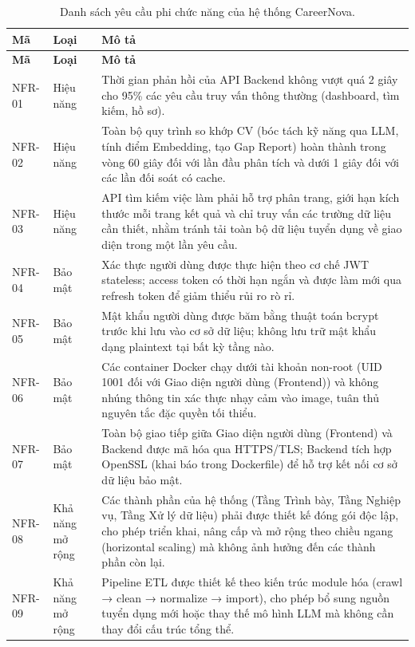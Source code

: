 \begin{longtable}{|L{1.5cm}|L{2.8cm}|L{9.2cm}|}
\caption{Danh sách yêu cầu phi chức năng của hệ thống CareerNova.}
\label{tab:nonfunctional_requirements} \\
\hline
\textbf{Mã} & \textbf{Loại} & \textbf{Mô tả} \\
\hline
\endfirsthead
\hline
\textbf{Mã} & \textbf{Loại} & \textbf{Mô tả} \\
\hline
\endhead
NFR-01 & Hiệu năng & Thời gian phản hồi của API Backend không vượt quá 2 giây cho 95\% các yêu cầu truy vấn thông thường (dashboard, tìm kiếm, hồ sơ). \\
\hline
NFR-02 & Hiệu năng & Toàn bộ quy trình so khớp CV (bóc tách kỹ năng qua LLM, tính điểm Embedding, tạo Gap Report) hoàn thành trong vòng 60 giây đối với lần đầu phân tích và dưới 1 giây đối với các lần đối soát có cache. \\
\hline
NFR-03 & Hiệu năng & API tìm kiếm việc làm phải hỗ trợ phân trang, giới hạn kích thước mỗi trang kết quả và chỉ truy vấn các trường dữ liệu cần thiết, nhằm tránh tải toàn bộ dữ liệu tuyển dụng về giao diện trong một lần yêu cầu. \\
\hline
NFR-04 & Bảo mật & Xác thực người dùng được thực hiện theo cơ chế JWT stateless; access token có thời hạn ngắn và được làm mới qua refresh token để giảm thiểu rủi ro rò rỉ. \\
\hline
NFR-05 & Bảo mật & Mật khẩu người dùng được băm bằng thuật toán bcrypt trước khi lưu vào cơ sở dữ liệu; không lưu trữ mật khẩu dạng plaintext tại bất kỳ tầng nào. \\
\hline
NFR-06 & Bảo mật & Các container Docker chạy dưới tài khoản non-root (UID 1001 đối với Giao diện người dùng (Frontend)) và không nhúng thông tin xác thực nhạy cảm vào image, tuân thủ nguyên tắc đặc quyền tối thiểu. \\
\hline
NFR-07 & Bảo mật & Toàn bộ giao tiếp giữa Giao diện người dùng (Frontend) và Backend được mã hóa qua HTTPS/TLS; Backend tích hợp OpenSSL (khai báo trong Dockerfile) để hỗ trợ kết nối cơ sở dữ liệu bảo mật. \\
\hline
NFR-08 & Khả năng mở rộng & Các thành phần của hệ thống (Tầng Trình bày, Tầng Nghiệp vụ, Tầng Xử lý dữ liệu) phải được thiết kế đóng gói độc lập, cho phép triển khai, nâng cấp và mở rộng theo chiều ngang (horizontal scaling) mà không ảnh hưởng đến các thành phần còn lại. \\
\hline
NFR-09 & Khả năng mở rộng & Pipeline ETL được thiết kế theo kiến trúc module hóa (crawl → clean → normalize → import), cho phép bổ sung nguồn tuyển dụng mới hoặc thay thế mô hình LLM mà không cần thay đổi cấu trúc tổng thể. \\

\end{longtable}
